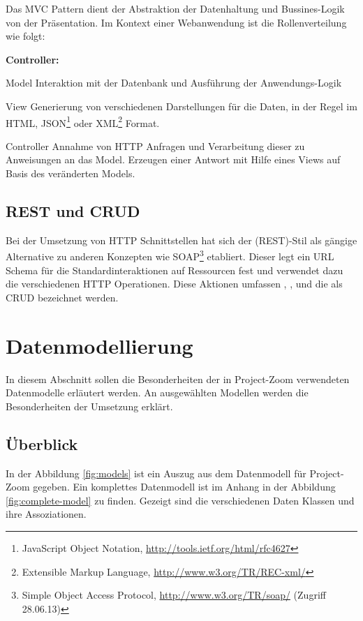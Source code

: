 Das MVC Pattern dient der Abstraktion der Datenhaltung und Bussines-Logik von der Präsentation. Im Kontext einer Webanwendung ist die Rollenverteilung wie folgt:
\begin{labeling}{\textbf{Controller:}}
\item[Model] Interaktion mit der Datenbank und Ausführung der Anwendungs-Logik
\item[View] Generierung von verschiedenen Darstellungen für die Daten, in der Regel im HTML, JSON\footnote{JavaScript Object Notation, \url{http://tools.ietf.org/html/rfc4627}} oder XML\footnote{Extensible Markup Language, \url{http://www.w3.org/TR/REC-xml/}} Format.
\item[Controller] Annahme von HTTP Anfragen und  Verarbeitung dieser zu Anweisungen an das Model. Erzeugen einer Antwort mit Hilfe eines Views auf Basis des veränderten Models.
\end{labeling}

\subsection{REST und CRUD}

Bei der Umsetzung von HTTP Schnittstellen hat sich der  (REST)-Stil als gängige Alternative zu anderen Konzepten wie SOAP\footnote{Simple Object Access Protocol, \url{http://www.w3.org/TR/soap/} (Zugriff 28.06.13)} etabliert. Dieser legt ein URL Schema für die Standardinteraktionen auf Ressourcen fest und verwendet dazu die verschiedenen HTTP Operationen. Diese Aktionen umfassen , ,  und  die als CRUD bezeichnet werden.


\section{Datenmodellierung}
\label{sec:model}
In diesem Abschnitt sollen die Besonderheiten der in Project-Zoom verwendeten Datenmodelle erläutert werden. An ausgewählten Modellen werden die Besonderheiten der Umsetzung erklärt.

\subsection{Überblick}

In der Abbildung \ref{fig:models} ist ein Auszug aus dem Datenmodell für Project-Zoom gegeben. Ein komplettes Datenmodell ist im Anhang in der Abbildung \ref{fig:complete-model} zu finden. Gezeigt sind die verschiedenen Daten Klassen und ihre Assoziationen. 

